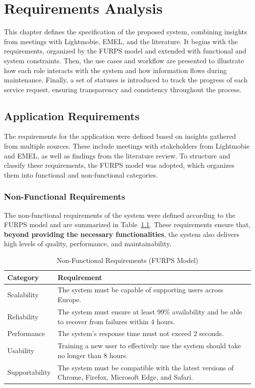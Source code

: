 \chapter{Requirements Analysis}%
\label{chapter:requirementsAnalysis}

\begin{introduction}
This chapter defines the specification of the proposed system, combining insights from meetings with Lightmobie, EMEL, and the literature. It begins with the requirements, organized by the FURPS model and extended with functional and system constraints. Then, the use cases and workflow are presented to illustrate how each role interacts with the system and how information flows during maintenance. Finally, a set of statuses is introduced to track the progress of each service request, ensuring transparency and consistency throughout the process.
\end{introduction} 




\section{Application Requirements}
The requirements for the application were defined based on insights gathered from multiple sources. These include meetings with stakeholders from Lightmobie and EMEL, as well as findings from the literature review. To structure and classify these requirements, the FURPS model was adopted, which organizes them into functional and non-functional categories.

\subsection{Non-Functional Requirements}
The non-functional requirements of the system were defined according to the FURPS model and are summarized in Table~\ref{tab:nfr}. These requirements ensure that, \textbf{beyond providing the necessary functionalities}, the system also delivers high levels of quality, performance, and maintainability.

\begin{table}[htbp]
\centering
\begin{tabular}{|l|p{10cm}|}
\hline
\textbf{Category} & \textbf{Requirement} \\ \hline
Scalability & The system must be capable of supporting users across Europe. \\ \hline
Reliability & The system must ensure at least 99\% availability and be able to recover from failures within 4 hours. \\ \hline
Performance & The system's response time must not exceed 2 seconds. \\ \hline
Usability & Training a new user to effectively use the system should take no longer than 8 hours. \\ \hline
Supportability & The system must be compatible with the latest versions of Chrome, Firefox, Microsoft Edge, and Safari. \\ \hline
\end{tabular} 
\label{tab:nfr}
\caption{Non-Functional Requirements (FURPS Model)}
\end{table}

